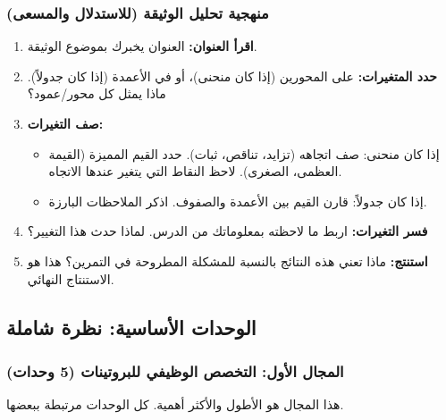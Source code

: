 \documentclass[12pt,a4paper]{book}
\begin{document}
	\subsubsection*{منهجية تحليل الوثيقة (للاستدلال والمسعى)}
	\begin{enumerate}
		\item \textbf{اقرأ العنوان:} العنوان يخبرك بموضوع الوثيقة.
		\item \textbf{حدد المتغيرات:} على المحورين (إذا كان منحنى)، أو في الأعمدة (إذا كان جدولاً). ماذا يمثل كل محور/عمود؟
		\item \textbf{صف التغيرات:}
		\begin{itemize}
			\item إذا كان منحنى: صف اتجاهه (تزايد، تناقص، ثبات). حدد القيم المميزة (القيمة العظمى، الصغرى). لاحظ النقاط التي يتغير عندها الاتجاه.
			\item إذا كان جدولاً: قارن القيم بين الأعمدة والصفوف. اذكر الملاحظات البارزة.
		\end{itemize}
		\item \textbf{فسر التغيرات:} اربط ما لاحظته بمعلوماتك من الدرس. لماذا حدث هذا التغيير؟
		\item \textbf{استنتج:} ماذا تعني هذه النتائج بالنسبة للمشكلة المطروحة  \newline في التمرين؟ هذا هو الاستنتاج النهائي.
	\end{enumerate}
	
	\subsection{الوحدات الأساسية: نظرة شاملة}
	
	
	
	\subsubsection*{المجال الأول: التخصص الوظيفي للبروتينات (5 وحدات)}
	هذا المجال هو الأطول والأكثر أهمية. كل الوحدات مرتبطة ببعضها.
	
\end{document}
